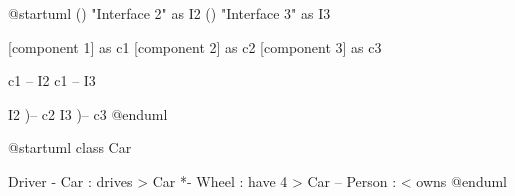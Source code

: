 \documentclass{scrartcl}
\begin{document}
	\begin{plantuml}
		@startuml
		() "Interface 2" as I2
		() "Interface 3" as I3

		[component 1] as c1
		[component 2] as c2
		[component 3] as c3
		
		c1 -- I2
		c1 -- I3
		
		I2 )-- c2
		I3 )-- c3
		@enduml
	\end{plantuml}
	
\newpage

	\begin{plantuml}
		@startuml
		class Car
		
		Driver - Car : drives >
		Car *- Wheel : have 4 >
		Car -- Person : < owns
		@enduml
	\end{plantuml}
\end{document}
